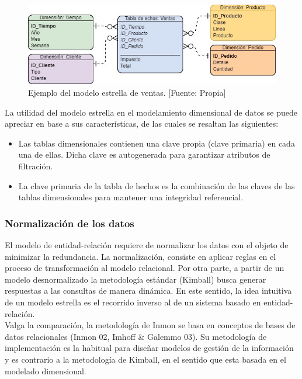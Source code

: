 \documentclass[11pt,titlepage]{report}
\begin{document}
\begin{figure}[h]
	\centering
	\includegraphics[width=1\linewidth]{Figuras/starModel}
	\caption{Ejemplo del modelo estrella de ventas. [Fuente: Propia]}
	\label{fig: starModel}
\end{figure}

La utilidad del modelo estrella en el modelamiento dimensional de datos se puede apreciar en base a sus características, de las cuales se resaltan las siguientes:

\begin{multicols}{2}
\begin{itemize}

\item Las tablas dimensionales contienen una clave propia (clave primaria) en cada una de ellas. Dicha clave es autogenerada para garantizar atributos de filtración.

\item La clave primaria de la tabla de hechos es la combinación de las claves de las tablas dimensionales para mantener una integridad referencial.

\end{itemize}
\end{multicols}	


\subsubsection{Normalización de los datos}
El modelo de entidad-relación requiere de normalizar los datos con el objeto de minimizar la redundancia. La normalización, consiste en aplicar reglas en el proceso de transformación al modelo relacional. Por otra parte, a partir de un modelo desnormalizado la metodología estándar (Kimball) busca generar respuestas a las consultas de manera dinámica. En este sentido, la idea intuitiva de un modelo estrella es el recorrido inverso al de un sistema basado en entidad-relación.\\

Valga la comparación, la metodología de Inmon se basa en conceptos de bases de datos relacionales (Inmon 02, Imhoff \& Galemmo 03). Su metodología de implementación es la habitual para diseñar modelos de gestión de la información y es contrario a la metodología de Kimball, en el sentido que esta basada en el modelado dimensional.\\
\end{document}

